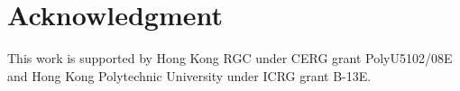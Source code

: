 \documentclass[10pt, conference, compsocconf]{IEEEtran}
\begin{document}










\section*{Acknowledgment}
This work is supported by Hong Kong RGC under CERG grant PolyU5102/08E and Hong Kong Polytechnic University under ICRG grant B-13E.



\end{document}
